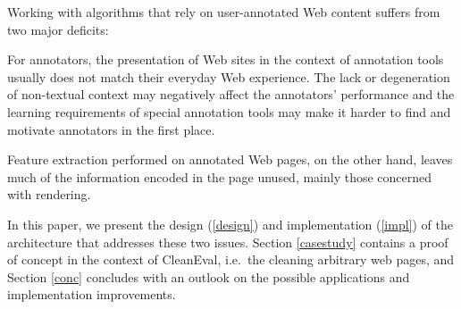 Working with algorithms that rely on user-annotated Web content suffers from two major deficits:

For annotators, the presentation of Web sites in the context of annotation tools usually does not match their everyday Web experience.
The lack or degeneration of non-textual context may negatively affect the annotators' performance
and the learning requirements of special annotation tools may make it harder to find and motivate annotators in the first place.

Feature extraction performed on annotated Web pages, on the other hand, leaves much of the information encoded in the page unused,
mainly those concerned with rendering.

In this paper, we present the design (\ref{design}) and implementation (\ref{impl}) of the {\KrdWrd} architecture that addresses these two issues.
Section \ref{casestudy} contains a proof of concept in the context of CleanEval, i.e.~the cleaning arbitrary web pages,
and Section \ref{conc} concludes with an outlook on the possible applications and implementation improvements.
